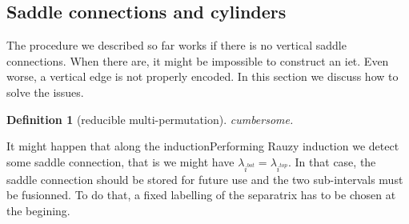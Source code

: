\documentclass{article}
\newtheorem{definition}{Definition}
\newcommand{\commv}[1]{{\color{red!50!gray}{#1}}}
\begin{document}
\commv{TODO: implement the reduction algorithm that consists in reducing
a multi-iet to an iet via
\begin{enumerate}
\item if there is any aggregation, do it
\item if there is no, perform Rauzy inductions until there is one
\end{enumerate}}

\subsection{Saddle connections and cylinders}
The procedure we described so far works if there is no vertical saddle connections.
When there are, it might be impossible to construct an iet. Even worse, a vertical
edge is not properly encoded. In this section we discuss how to solve the issues.

\begin{definition}[reducible multi-permutation]
cumbersome.
\end{definition}

It might happen that along the inductionPerforming Rauzy induction we detect some saddle connection,
that is we might have $\lambda_{i^{bot}} = \lambda_{i^{top}}$. In that case, the
saddle connection should be stored for future use and the two sub-intervals must be
fusionned. To do that, a fixed labelling of the separatrix has to be chosen at
the begining.
\end{document}
